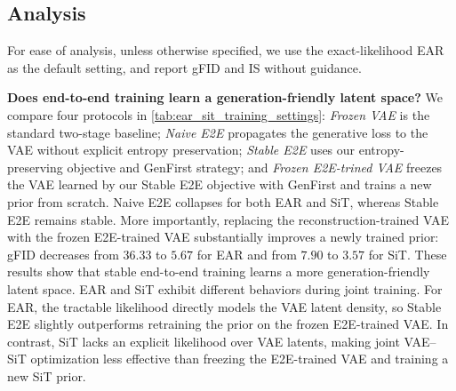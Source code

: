 \documentclass[]{bytedance_seed}
\begin{document}
\subsection{Analysis}
\label{subsec:analysis}
For ease of analysis, unless otherwise specified, we use the exact-likelihood EAR as the default setting, and report gFID and IS without guidance.

\textbf{Does end-to-end training learn a generation-friendly latent space?}
We compare four protocols in \cref{tab:ear_sit_training_settings}:
\textit{Frozen VAE} is the standard two-stage baseline; 
\textit{Naive E2E} propagates the generative loss to the VAE without explicit entropy preservation; \textit{Stable E2E} uses our entropy-preserving objective and GenFirst strategy; 
and \textit{Frozen E2E-trined VAE} freezes the VAE learned by our Stable E2E objective with GenFirst and trains a new prior from scratch.
Naive E2E collapses for both EAR and SiT, whereas Stable E2E remains stable.
More importantly, replacing the reconstruction-trained VAE with the frozen E2E-trained VAE substantially improves a newly trained prior: gFID decreases from $36.33$ to $5.67$ for EAR and from $7.90$ to $3.57$ for SiT.
These results show that stable end-to-end training learns a more generation-friendly latent space.
EAR and SiT exhibit different behaviors during joint training.
For EAR, the tractable likelihood directly models the VAE latent density, so Stable E2E slightly outperforms retraining the prior on the frozen E2E-trained VAE.
In contrast, SiT lacks an explicit likelihood over VAE latents, making joint VAE--SiT optimization less effective than freezing the E2E-trained VAE and training a new SiT prior.
\end{document}
